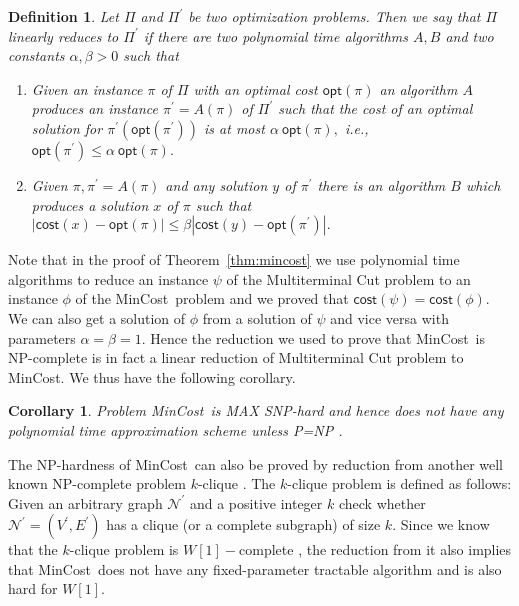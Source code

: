 \documentclass[journal]{IEEEtran}
\newtheorem{corollary}{{\bf Corollary}}
\newtheorem{definition}{{\bf Definition}}
\newcommand{\net}{\mathcal{N}}
\newcommand{\netnodes}{V}
\newcommand{\netedges}{E}
\newcommand{\mincost}{\textsf{MinCost}}
\begin{document}
\begin{definition}
  Let $\Pi$ and $\Pi^{\prime}$ be two optimization problems. Then we
  say that $\Pi$ linearly reduces to $\Pi^{\prime}$ if there are two
  polynomial time algorithms $A,B$ and two constants $\alpha,\beta >
  0$ such that
\begin{enumerate}
  \item Given an instance $\pi$ of $\Pi$ with an optimal cost
    $\mathsf{opt}(\pi)$ an algorithm $A$ produces an instance
    $\pi^{\prime} = A(\pi)$ of $\Pi^{\prime}$ such that the cost of an
    optimal solution for $\pi^{\prime} (\mathsf{opt}(\pi^{\prime}))$
    is at most $\alpha\ \mathsf{opt}(\pi),$ i.e., $\mathsf{opt}(\pi^{\prime}) \leq \alpha\ \mathsf{opt}(\pi).$
  \item Given $\pi, \pi^{\prime} = A(\pi)$ and any solution $y$ of
    $\pi^{\prime}$ there is an algorithm $B$ which produces a solution
    $x$ of $\pi$ such that $|\mathsf{cost}(x) - \mathsf{opt}(\pi)| \leq \beta |\mathsf{cost}(y) - \mathsf{opt}(\pi^{\prime})|.$
  \end{enumerate}
\end{definition}

Note that in the proof of Theorem~\ref{thm:mincost} we use polynomial
time algorithms to reduce an instance $\psi$ of the Multiterminal Cut
problem to an instance $\phi$ of the \mincost\ problem and we proved
that $\mathsf{cost}(\psi) = \mathsf{cost}(\phi).$ We can also get a
solution of $\phi$ from a solution of $\psi$ and vice versa with
parameters $\alpha = \beta = 1.$ Hence the reduction we used to prove
that \mincost\ is NP-complete is in fact a linear reduction of
Multiterminal Cut problem to \mincost. We thus have the following
corollary.

\begin{corollary}
  Problem \mincost\ is MAX SNP-hard and hence does not have any
  polynomial time approximation scheme unless P=NP \cite{Arora92}.
\end{corollary}



The NP-hardness of \mincost\ can also be proved by reduction from
another well known NP-complete problem $k$-clique \cite{Garey79}.  The
$k$-clique problem is defined as follows: Given an arbitrary graph
$\net^{\prime}$ and a positive integer $k$ check whether
$\net^{\prime} = (\netnodes^{\prime},\netedges^{\prime})$ has a clique
(or a complete subgraph) of size $k.$ Since we know that the
$k$-clique problem is $W[1]-$complete \cite{Downey99}, the reduction
from it also implies that \mincost\ does not have any fixed-parameter
tractable algorithm and is also hard for $W[1].$
\end{document}
